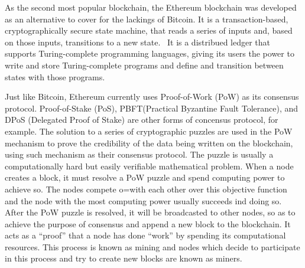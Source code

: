     As the second most popular blockchain, the Ethereum blockchain was developed as an alternative to cover for the lackings of Bitcoin.
    It is a transaction-based, cryptographically secure state machine, that reads a series of inputs and, based on those inputs, transitions to a new state.~\cite{ferreira2022smart}
    It is a distribued ledger that supports Turing-complete programming languages, giving its users the power to write and store Turing-complete programs and define and transition between states with those programs.

    Just like Bitcoin, Ethereum currently uses Proof-of-Work (PoW) as its consensus protocol.
    Proof-of-Stake (PoS), PBFT(Practical Byzantine Fault Tolerance), and DPoS (Delegated Proof of Stake) are other forms of concensus protocol, for example.
    The solution to a series of cryptographic puzzles are used in the PoW mechanism to prove the credibility of the data being written on the blockchain, using such mechanism as their consensus protocol.
    The puzzle is usually a computationally hard but easily verifiable mathematical problem.
    When a node creates a block, it must resolve a PoW puzzle and spend computing power to achieve so. The nodes compete o=with each other over this objective function and the node with the most computing power usually succeeds ind doing so.
    After the PoW puzzle is resolved, it will be broadcasted to other nodes, so as to achieve the purpose of consensus and append a new block to the blockchain.
    It acts as a “proof” that a node has done “work” by spending its computational resources.
    This process is known as mining and nodes which decide to participate in this process and try to create new blocks are known as miners.

